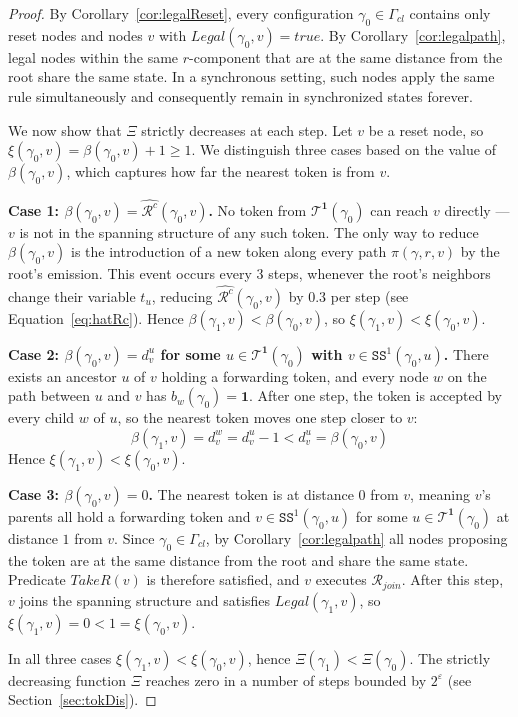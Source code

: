 \documentclass[a4paper, 12pt]{article}
\newcommand{\bo}{\mathbf{1}}
\newcommand{\Ss}{\texttt{SS}^1}
\newcommand{\Rjoin}{$\mathscr{R}_{join}$}
\begin{document}
\begin{proof}
By Corollary~\ref{cor:legalReset}, every configuration $\gamma_0 \in 
\Gamma_{cl}$ contains only reset nodes and nodes $v$ with 
$Legal(\gamma_0, v) = \mathit{true}$. By 
Corollary~\ref{cor:legalpath}, legal nodes within the same 
$r$-component that are at the same distance from the root share the 
same state. In a synchronous setting, such nodes apply the same rule 
simultaneously and consequently remain in synchronized states forever.

We now show that $\Xi$ strictly decreases at each step. Let $v$ be a 
reset node, so $\xi(\gamma_0, v) = \beta(\gamma_0, v) + 1 \geq 1$. 
We distinguish three cases based on the value of $\beta(\gamma_0, v)$, 
which captures how far the nearest token is from $v$.

\medskip
\noindent\textbf{Case 1: $\beta(\gamma_0, v) = 
\widehat{\mathcal{R}^c}(\gamma_0, v)$.}
No token from $\mathcal{T}^{\bo}(\gamma_0)$ can reach $v$ directly 
— $v$ is not in the spanning structure of any such token. The only 
way to reduce $\beta(\gamma_0, v)$ is the introduction of a new token 
along every path $\pi(\gamma, r, v)$ by the root's emission. This 
event occurs every $3$ steps, whenever the root's neighbors change 
their variable $t_u$, reducing $\widehat{\mathcal{R}^c}(\gamma_0, v)$ 
by $0.3$ per step (see Equation~\ref{eq:hatRc}). Hence 
$\beta(\gamma_1, v) < \beta(\gamma_0, v)$, so 
$\xi(\gamma_1, v) < \xi(\gamma_0, v)$.

\medskip
\noindent\textbf{Case 2: $\beta(\gamma_0, v) = d^u_v$ for some 
$u \in \mathcal{T}^{\bo}(\gamma_0)$ with $v \in \Ss(\gamma_0, u)$.}
There exists an ancestor $u$ of $v$ holding a forwarding token, and 
every node $w$ on the path between $u$ and $v$ has $b_w(\gamma_0) = 
\bo$. After one step, the token is accepted by every child $w$ of $u$, 
so the nearest token moves one step closer to $v$:
$$\beta(\gamma_1, v) = d^w_v = d^u_v - 1 < d^u_v = \beta(\gamma_0, v)$$
Hence $\xi(\gamma_1, v) < \xi(\gamma_0, v)$.

\medskip
\noindent\textbf{Case 3: $\beta(\gamma_0, v) = 0$.}
The nearest token is at distance $0$ from $v$, meaning $v$'s parents 
all hold a forwarding token and $v \in \Ss(\gamma_0, u)$ for 
some $u \in \mathcal{T}^{\bo}(\gamma_0)$ at distance $1$ from $v$. 
Since $\gamma_0 \in \Gamma_{cl}$, by Corollary~\ref{cor:legalpath} 
all nodes proposing the token are at the same distance from the root 
and share the same state. Predicate $\mathit{TakeR}(v)$ is therefore 
satisfied, and $v$ executes \Rjoin. After this step, $v$ joins the 
spanning structure and satisfies $Legal(\gamma_1, v)$, so 
$\xi(\gamma_1, v) = 0 < 1 = \xi(\gamma_0, v)$.

\medskip
In all three cases $\xi(\gamma_1, v) < \xi(\gamma_0, v)$, hence 
$\Xi(\gamma_1) < \Xi(\gamma_0)$. The strictly decreasing function 
$\Xi$ reaches zero in a number of steps bounded by $2^\varepsilon$ 
(see Section~\ref{sec:tokDis}).
\end{proof}
\end{document}

